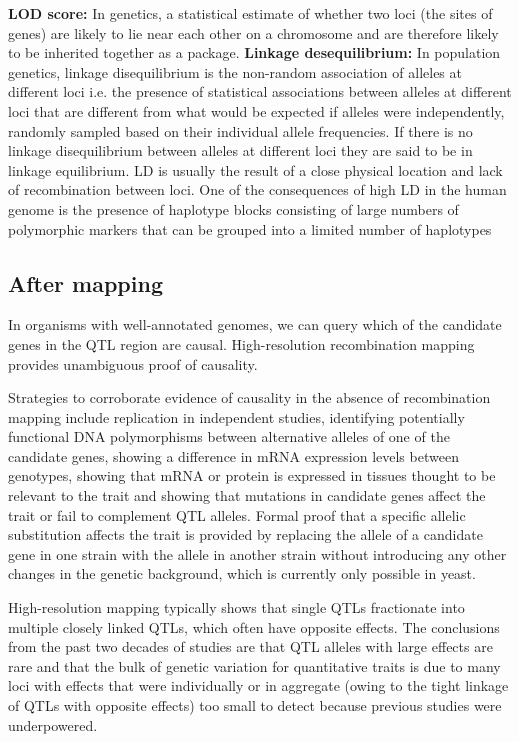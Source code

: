 \documentclass[a4paper,10pt]{article}
\begin{document}
\textbf{LOD score:} In genetics, a statistical estimate of whether two loci (the sites of genes) are likely to lie near each other on a chromosome and are therefore likely to be inherited together as a package.
\textbf{Linkage desequilibrium:} In population genetics, linkage disequilibrium is the non-random association of alleles at different loci i.e. the presence of statistical associations between alleles at different loci that are different from what would be expected if alleles were independently, randomly sampled based on their individual allele frequencies. 
If there is no linkage disequilibrium between alleles at different loci they are said to be in linkage equilibrium.
LD is usually the result of a close physical location and lack of recombination between loci. 
One of the consequences of high LD in the human genome is the presence of haplotype blocks consisting of large numbers of polymorphic markers that can be grouped into a limited number of haplotypes

\subsection{After mapping}
In organisms with well-annotated genomes, we can query which of the candidate genes in the QTL region are causal. 
High-resolution recombination mapping provides unambiguous proof of causality. 

Strategies to corroborate evidence of causality in the absence of recombination mapping include replication in independent studies, identifying potentially functional DNA polymorphisms between alternative alleles of one of the candidate genes, showing a difference in
mRNA expression levels between genotypes, showing that mRNA or protein is expressed in tissues thought to be relevant to the trait and showing that mutations in candidate genes affect the trait or fail to complement QTL alleles. 
Formal proof that a specific allelic substitution affects the trait is provided by replacing the allele of a candidate gene in one strain with the allele in another strain without introducing any other changes in the genetic background, which is currently only possible in yeast.

High-resolution mapping typically shows that single QTLs fractionate into multiple closely linked QTLs, which often have opposite effects.
The conclusions from the past two decades of studies are that QTL alleles with large effects are rare and that the bulk of genetic variation for quantitative traits is due to many loci with effects 
that were individually or in aggregate (owing to the tight linkage of QTLs with opposite effects) too small to detect because previous studies were underpowered.
\end{document}

